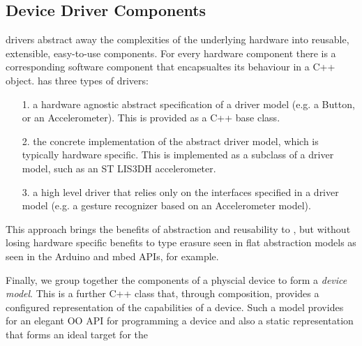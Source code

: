 \subsection{Device Driver Components}
\CO drivers abstract away the complexities of the underlying hardware into reusable, extensible, easy-to-use components. For every hardware component there is a corresponding software component that encapsualtes its behaviour in a C++ object. \CO has three types of drivers:
\begin{itemize}
    \item[1.] a hardware agnostic abstract specification of a driver model (e.g. a Button, or an Accelerometer). This is provided as a C++ base class.
    \item[2.] the concrete implementation of the abstract driver model, which is typically hardware specific. This is implemented as a subclass of a driver model, such as an ST LIS3DH accelerometer.
    \item[3.] a high level driver that relies only on the interfaces specified in a driver model (e.g. a gesture recognizer based on an Accelerometer model).

\end{itemize}

This approach brings the benefits of abstraction and reusability to \CO, but without losing hardware specific benefits to type erasure seen in flat abstraction models as seen in the Arduino and mbed APIs, for example.

Finally, we group together the components of a physcial device to form a \emph{device model}. This is a further C++ class that, through composition, provides a configured representation of the capabilities of a device. Such a model provides for an elegant OO API for programming a device and also a static representation that forms an ideal target for the 




